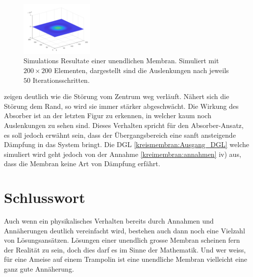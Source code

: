 \begin{figure}
\begin{center}
		\includegraphics[width=0.32\textwidth]{papers/kreismembran/images/sim_2_6.png}
		\caption{Simulations Resultate einer unendlichen Membran. Simuliert mit $ 200 \times 200 $ Elementen, dargestellt sind die Auslenkungen nach jeweils $ 50 $ Iterationsschritten.}
		\label{kreismembran:im:simres_unendlich}
		
	\end{center}	
\end{figure}
zeigen deutlich wie die Störung vom Zentrum weg verläuft.
Nähert sich die Störung dem Rand, so wird sie immer stärker abgeschwächt.
Die Wirkung des Absorber ist an der letzten Figur zu erkennen, in welcher kaum noch Auslenkungen zu sehen sind.
Dieses Verhalten spricht für den Absorber-Ansatz, es soll jedoch erwähnt sein, dass der Übergangsbereich eine sanft ansteigende Dämpfung in das System bringt.
Die DGL \ref{kreismembran:Ausgang_DGL} welche simuliert wird geht jedoch von der Annahme \ref{kreimembran:annahmen} iv) aus, dass die Membran keine Art von Dämpfung erfährt.

\section{Schlusswort}
Auch wenn ein physikalisches Verhalten bereits durch Annahmen und Annäherungen deutlich vereinfacht wird, bestehen auch dann noch eine Vielzahl von Lösungsansätzen.
Lösungen einer unendlich grosse Membran scheinen fern der Realität zu sein, doch dies darf es im Sinne der Mathematik.
Und wer weiss, für eine Ameise auf einem Trampolin ist eine unendliche Membran vielleicht eine ganz gute Annäherung. 







